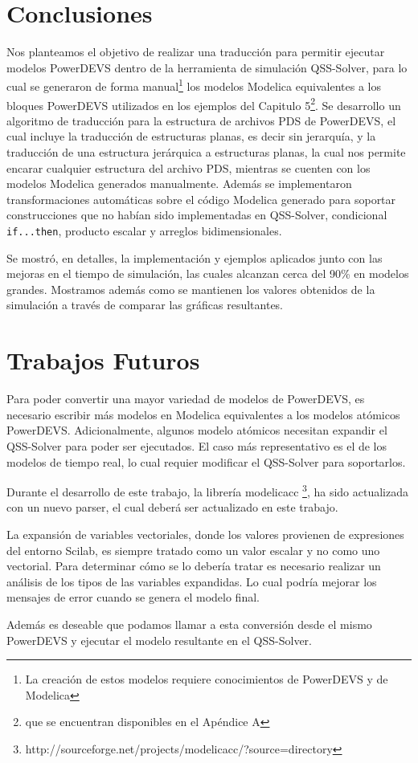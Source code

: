 
\section{Conclusiones}

	Nos planteamos el objetivo de realizar una traducción para permitir ejecutar modelos PowerDEVS dentro de la herramienta de simulación QSS-Solver, 
	para lo cual se generaron de forma manual\footnote{La creación de estos modelos requiere conocimientos de PowerDEVS y de Modelica} los modelos 
	Modelica equivalentes a los bloques PowerDEVS utilizados en los ejemplos del Capitulo 5\footnote{que se encuentran disponibles en el Apéndice A}.
        Se desarrollo un algoritmo de traducción para la estructura de archivos PDS de PowerDEVS, el cual incluye la traducción de estructuras planas,
	 es decir sin jerarquía, y la traducción de una estructura jerárquica a estructuras planas, la cual nos permite encarar cualquier estructura 
	del archivo PDS, mientras se cuenten con los modelos Modelica generados manualmente. Además se implementaron transformaciones automáticas 
	sobre el código Modelica generado para soportar construcciones que no habían sido implementadas en QSS-Solver, condicional \texttt{if...then}, 
	producto escalar y arreglos bidimensionales.

	Se mostró, en detalles, la implementación y ejemplos aplicados junto con las mejoras en el tiempo de simulación, las cuales alcanzan cerca del 90\%
	 en modelos grandes. Mostramos además como se mantienen los valores obtenidos de la simulación a través de comparar las gráficas resultantes.

\section{Trabajos Futuros}
	Para poder convertir una mayor variedad de modelos de PowerDEVS, es necesario escribir más modelos en Modelica equivalentes a los modelos atómicos PowerDEVS.
	Adicionalmente, algunos modelo atómicos necesitan expandir el QSS-Solver para poder ser ejecutados. El caso más representativo es el de los modelos de tiempo
	 real, lo cual requier modificar el QSS-Solver para soportarlos.

	Durante el desarrollo de este trabajo, la librería modelicacc \footnote{http://sourceforge.net/projects/modelicacc/?source=directory}, ha sido actualizada 
	con un nuevo parser, el cual deberá ser actualizado en este trabajo.

	La expansión de variables vectoriales, donde los valores provienen de expresiones del entorno Scilab, es siempre tratado como un valor escalar y no como 
	uno vectorial. Para determinar cómo se lo debería tratar es necesario realizar un análisis de los tipos de las variables expandidas. 
	Lo cual podría mejorar los mensajes de error cuando se genera el modelo final.

	Además es deseable que podamos llamar a esta conversión desde el mismo PowerDEVS y ejecutar el modelo resultante en el QSS-Solver.

